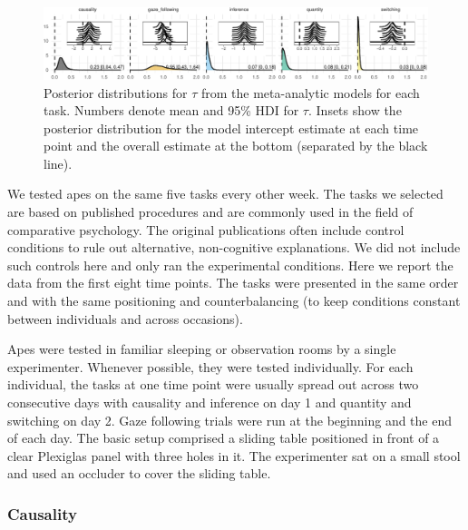 \documentclass[10pt, letterpaper]{article}
\newenvironment{CodeChunk}{}{}
\begin{document}
\begin{CodeChunk}
\begin{figure}[h]

{\centering \includegraphics{figs/metaplot-1} 

}

\caption[Posterior distributions for $\tau$ from the meta-analytic models for each task]{Posterior distributions for $\tau$ from the meta-analytic models for each task. Numbers denote mean and 95\% HDI for $\tau$. Insets show the posterior distribution for the model intercept estimate at each time point and the overall estimate at the bottom (separated by the black line).}\label{fig:metaplot}
\end{figure}
\end{CodeChunk}

We tested apes on the same five tasks every other week. The tasks we
selected are based on published procedures and are commonly used in the
field of comparative psychology. The original publications often include
control conditions to rule out alternative, non-cognitive explanations.
We did not include such controls here and only ran the experimental
conditions. Here we report the data from the first eight time points.
The tasks were presented in the same order and with the same positioning
and counterbalancing (to keep conditions constant between individuals
and across occasions).

Apes were tested in familiar sleeping or observation rooms by a single
experimenter. Whenever possible, they were tested individually. For each
individual, the tasks at one time point were usually spread out across
two consecutive days with causality and inference on day 1 and quantity
and switching on day 2. Gaze following trials were run at the beginning
and the end of each day. The basic setup comprised a sliding table
positioned in front of a clear Plexiglas panel with three holes in it.
The experimenter sat on a small stool and used an occluder to cover the
sliding table.

\hypertarget{causality}{%
\subsubsection{Causality}\label{causality}}
\end{document}
